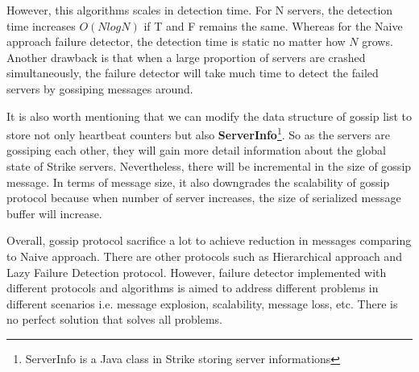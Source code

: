 \documentclass[dareport.tex]{subfiles}
\begin{document}
However, this algorithms scales in detection time. For N servers, the detection time increases $O(NlogN)$\cite{gossip} if T and F remains the same. Whereas for the Naive approach failure detector, the detection time is static no matter how $N$ grows. Another drawback is that when a large proportion of servers are crashed simultaneously, the failure detector will take much time to detect the failed servers by gossiping messages around.

It is also worth mentioning that we can modify the data structure of gossip list to store not only heartbeat counters but also \textbf{ServerInfo}\footnote{ServerInfo is a Java class in Strike storing server informations}. So as the servers are gossiping each other, they will gain more detail information about the global state of Strike servers. Nevertheless, there will be incremental in the size of gossip message. In terms of message size, it also downgrades the scalability of gossip protocol because when number of server increases, the size of serialized message buffer will increase.

Overall, gossip protocol sacrifice a lot to achieve reduction in messages comparing to Naive approach. There are other protocols such as Hierarchical approach and Lazy Failure Detection protocol\cite{failuredetector}. However, failure detector implemented with different protocols and algorithms is aimed to address different problems in different scenarios i.e. message explosion, scalability, message loss, etc. There is no perfect solution that solves all problems.
\end{document}
